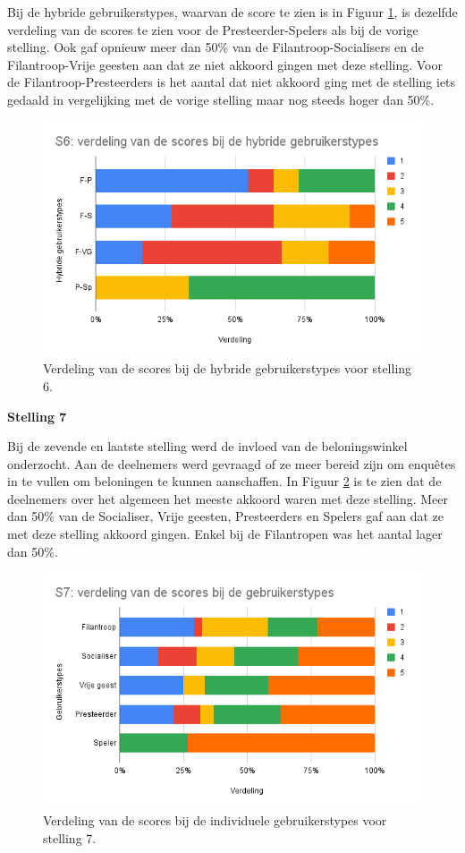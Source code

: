 Bij de hybride gebruikerstypes, waarvan de score te zien is in Figuur \ref{fig:s6_hybride}, is dezelfde verdeling van de scores te zien voor de Presteerder-Spelers als bij de vorige stelling. Ook gaf opnieuw meer dan 50\% van de Filantroop-Socialisers en de Filantroop-Vrije geesten aan dat ze niet akkoord gingen met deze stelling. Voor de Filantroop-Presteerders is het aantal dat niet akkoord ging met de stelling iets gedaald in vergelijking met de vorige stelling maar nog steeds hoger dan 50\%.

\begin{figure}
    \includegraphics[width=\linewidth]{S6_Hybride.png}
    \caption{Verdeling van de scores bij de hybride gebruikerstypes voor stelling 6.}
    \label{fig:s6_hybride}
\end{figure}

\textbf{Stelling 7}

Bij de zevende en laatste stelling werd de invloed van de beloningswinkel onderzocht. Aan de deelnemers werd gevraagd of ze meer bereid zijn om enquêtes in te vullen om beloningen te kunnen aanschaffen. In Figuur \ref{fig:s7} is te zien dat de deelnemers over het algemeen het meeste akkoord waren met deze stelling. Meer dan 50\% van de Socialiser, Vrije geesten, Presteerders en Spelers gaf aan dat ze met deze stelling akkoord gingen. Enkel bij de Filantropen was het aantal lager dan 50\%.

\begin{figure}
    \includegraphics[width=\linewidth]{S7.png}
    \caption{Verdeling van de scores bij de individuele gebruikerstypes voor stelling 7.}
    \label{fig:s7}
\end{figure}

